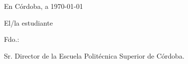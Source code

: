 \vspace{0.9cm}

\noindent En Córdoba, a \today

\vspace{1.0cm}

\begin{center}
\noindent El/la estudiante
\end{center}

\vspace{2cm}

\begin{center}   
\noindent Fdo.: \AutorTFG%

\vfill
Sr. Director de la Escuela Politécnica Superior de Córdoba.

\end{center}

\restoregeometry

\endinput


